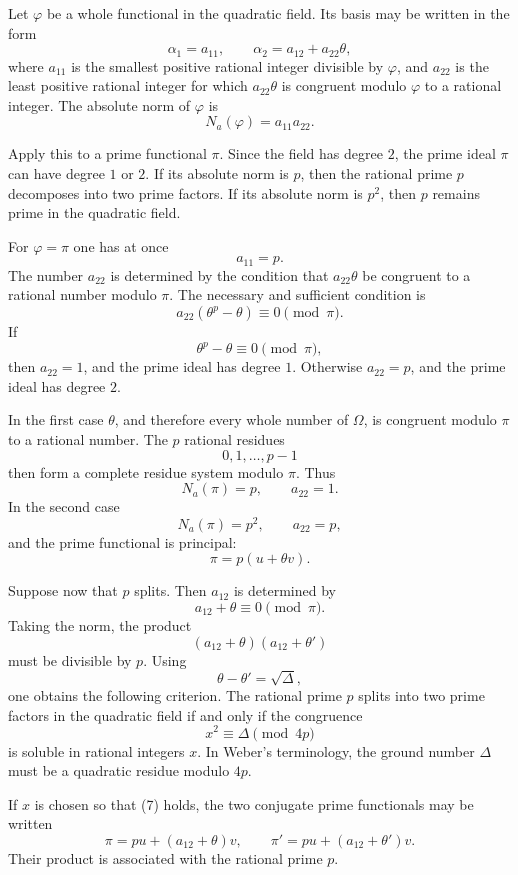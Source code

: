 \documentclass[12pt,a4paper]{article}
\begin{document}
Let \(\varphi\) be a whole functional in the quadratic field.  Its basis may be written in the form
\[
  \alpha_1=a_{11},\qquad
  \alpha_2=a_{12}+a_{22}\theta,
\tag{1}
\]
where \(a_{11}\) is the smallest positive rational integer divisible by \(\varphi\), and \(a_{22}\) is the least positive rational integer for which \(a_{22}\theta\) is congruent modulo \(\varphi\) to a rational integer.  The absolute norm of \(\varphi\) is
\[
  N_a(\varphi)=a_{11}a_{22}.
\tag{2}
\]

Apply this to a prime functional \(\pi\).  Since the field has degree \(2\), the prime ideal \(\pi\) can have degree \(1\) or \(2\).  If its absolute norm is \(p\), then the rational prime \(p\) decomposes into two prime factors.  If its absolute norm is \(p^2\), then \(p\) remains prime in the quadratic field.

For \(\varphi=\pi\) one has at once
\[
  a_{11}=p.
\]
The number \(a_{22}\) is determined by the condition that \(a_{22}\theta\) be congruent to a rational number modulo \(\pi\).  The necessary and sufficient condition is
\[
  a_{22}(\theta^p-\theta)\equiv0\pmod{\pi}.
\tag{3}
\]
If
\[
  \theta^p-\theta\equiv0\pmod{\pi},
\]
then \(a_{22}=1\), and the prime ideal has degree \(1\).  Otherwise \(a_{22}=p\), and the prime ideal has degree \(2\).

In the first case \(\theta\), and therefore every whole number of \(\Omega\), is congruent modulo \(\pi\) to a rational number.  The \(p\) rational residues
\[
  0,1,\ldots,p-1
\]
then form a complete residue system modulo \(\pi\).  Thus
\[
  N_a(\pi)=p,\qquad a_{22}=1.
\tag{4a}
\]
In the second case
\[
  N_a(\pi)=p^2,\qquad a_{22}=p,
\tag{4b}
\]
and the prime functional is principal:
\[
  \pi=p(u+\theta v).
\tag{5}
\]

Suppose now that \(p\) splits.  Then \(a_{12}\) is determined by
\[
  a_{12}+\theta\equiv0\pmod{\pi}.
\tag{6}
\]
Taking the norm, the product
\[
  (a_{12}+\theta)(a_{12}+\theta')
\]
must be divisible by \(p\).  Using
\[
  \theta-\theta'=\sqrt\Delta,
\]
one obtains the following criterion.  The rational prime \(p\) splits into two prime factors in the quadratic field if and only if the congruence
\[
  x^2\equiv\Delta\pmod{4p}
\tag{7}
\]
is soluble in rational integers \(x\).  In Weber's terminology, the ground number \(\Delta\) must be a quadratic residue modulo \(4p\).

If \(x\) is chosen so that (7) holds, the two conjugate prime functionals may be written
\[
  \pi=pu+(a_{12}+\theta)v,\qquad
  \pi'=pu+(a_{12}+\theta')v.
\tag{8}
\]
Their product is associated with the rational prime \(p\).
\end{document}
